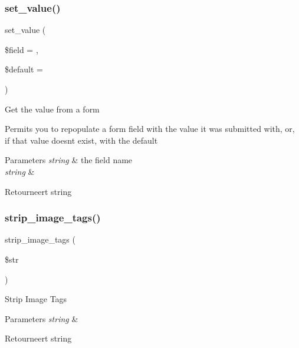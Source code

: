 \subsubsection{\texorpdfstring{set\_value()}{set\_value()}}
{\footnotesize\ttfamily set\+\_\+value (\begin{DoxyParamCaption}\item[{}]{\$field = {\ttfamily \textquotesingle{}\textquotesingle{}},  }\item[{}]{\$default = {\ttfamily \textquotesingle{}\textquotesingle{}} }\end{DoxyParamCaption})}

Get the value from a form

Permits you to repopulate a form field with the value it was submitted with, or, if that value doesn\textquotesingle{}t exist, with the default


\begin{DoxyParams}{Parameters}
{\em string} & the field name \\
\hline
{\em string} & \\
\hline
\end{DoxyParams}
\begin{DoxyReturn}{Retourneert}
string 
\end{DoxyReturn}
\mbox{\label{class_c_i___form__validation_abb836a42971c7bc641588db779c6ab1d}} 
\subsubsection{\texorpdfstring{strip\_image\_tags()}{strip\_image\_tags()}}
{\footnotesize\ttfamily strip\+\_\+image\+\_\+tags (\begin{DoxyParamCaption}\item[{}]{\$str }\end{DoxyParamCaption})}

Strip Image Tags


\begin{DoxyParams}{Parameters}
{\em string} & \\
\hline
\end{DoxyParams}
\begin{DoxyReturn}{Retourneert}
string 
\end{DoxyReturn}
\mbox{\label{class_c_i___form__validation_a9bec2f0a508e0327d4b048ecfc204522}} 
